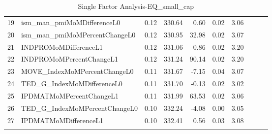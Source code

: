\begin{longtable}{rlrrrrrlll}
  19 & ism\_man\_pmiMoMDifferenceL0 & 0.12 & 330.64 & 0.60 & 0.02 & 3.06 &  &  &  \\ 
  20 & ism\_man\_pmiMoMPercentChangeL0 & 0.12 & 330.95 & 32.98 & 0.02 & 3.07 &  &  &  \\ 
  21 & INDPROMoMDifferenceL1 & 0.12 & 331.06 & 0.86 & 0.02 & 3.20 &  &  &  \\ 
  22 & INDPROMoMPercentChangeL1 & 0.12 & 331.24 & 90.14 & 0.02 & 3.20 &  &  &  \\ 
  23 & MOVE\_IndexMoMPercentChangeL0 & 0.11 & 331.67 & -7.15 & 0.04 & 3.07 &  &  &  \\ 
  24 & TED\_G\_IndexMoMDifferenceL0 & 0.11 & 331.70 & -0.13 & 0.02 & 3.02 &  &  &  \\ 
  25 & IPDMATMoMPercentChangeL1 & 0.11 & 331.99 & 63.53 & 0.02 & 3.06 &  &  &  \\ 
  26 & TED\_G\_IndexMoMPercentChangeL0 & 0.10 & 332.24 & -4.08 & 0.00 & 3.05 &  &  &  \\ 
  27 & IPDMATMoMDifferenceL1 & 0.10 & 332.41 & 0.56 & 0.03 & 3.08 &  &  &  \\ 
   \hline
\hline
\caption{Single Factor Analysis-EQ_small_cap} 
\end{longtable}
